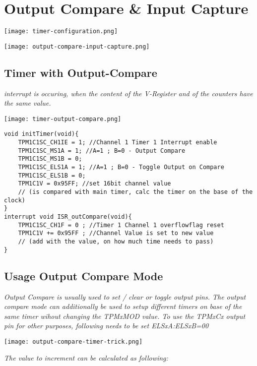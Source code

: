 \section{Output Compare \& Input Capture}

\texttt{[image: timer-configuration.png]}

\texttt{[image: output-compare-input-capture.png]}

\subsection{Timer with Output-Compare}

\textit{
    interrupt is occuring, when the content of the V-Register and
    of the counters have the same value.
}

\texttt{[image: timer-output-compare.png]}

\begin{lstlisting}
void initTimer(void){
    TPM1C1SC_CH1IE = 1; //Channel 1 Timer 1 Interrupt enable
    TPM1C1SC_MS1A = 1; //A=1 ; B=0 - Output Compare
    TPM1C1SC_MS1B = 0;
    TPM1C1SC_ELS1A = 1; //A=1 ; B=0 - Toggle Output on Compare
    TPM1C1SC_ELS1B = 0;
    TPM1C1V = 0x95FF; //set 16bit channel value
    // (is compared with main timer, calc the timer on the base of the clock)
}
interrupt void ISR_outCompare(void){
    TPM1C1SC_CH1F = 0 ; //Timer 1 Channel 1 overflowflag reset
    TPM1C1V += 0x95FF ; //Channel Value is set to new value
    // (add with the value, on how much time needs to pass)
}
\end{lstlisting}

\subsection{Usage Output Compare Mode}

\textit{
    Output Compare is usually used to set / clear or toggle output pins.
    \newline
    The output compare mode can additionally be used to setup
    different timers on base of the same timer wihout
    changing the TPMxMOD value. To use the TPMxCx output pin for other
    purposes, following needs to be set ELSxA:ELSxB=00
}

\texttt{[image: output-compare-timer-trick.png]}

\textit{
    The value to increment can be calculated as following:
    \newline
}

